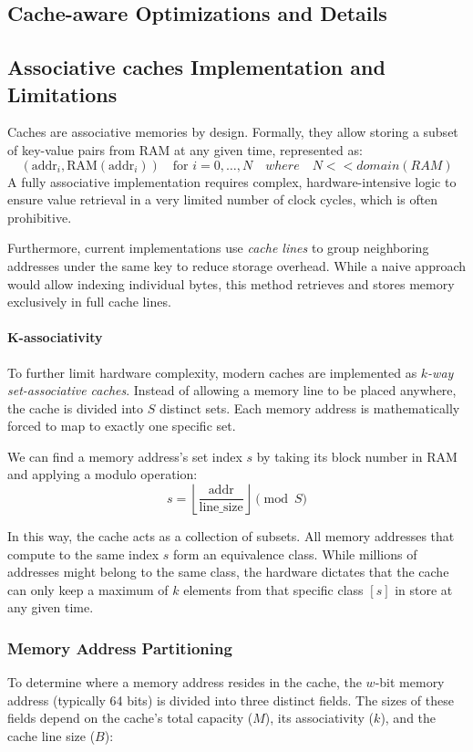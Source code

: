 \begin{appendices}
\section{Cache-aware Optimizations and Details}\label{app:caching}


\subsection{Associative caches Implementation and Limitations}\label{subsec:caching}
Caches are associative memories by design. Formally, they allow storing a subset of key-value pairs from RAM at any given time, represented as:
$$(\text{addr}_i, \text{RAM}(\text{addr}_i)) \quad \text{for } i = 0, \dots, N \quad where \quad  N << domain(RAM)$$
A fully associative implementation requires complex, hardware-intensive logic to ensure value retrieval in a very limited number of clock cycles, which is often prohibitive. 

Furthermore, current implementations use \emph{cache lines} to group neighboring addresses under the same key to reduce storage overhead. While a naive approach would allow indexing individual bytes, this method retrieves and stores memory exclusively in full cache lines.

\paragraph{K-associativity}To further limit hardware complexity, modern caches are implemented as \emph{$k$-way set-associative caches}. Instead of allowing a memory line to be placed anywhere, the cache is divided into $S$ distinct sets. Each memory address is mathematically forced to map to exactly one specific set.

We can find a memory address's set index $s$ by taking its block number in RAM and applying a modulo operation:
$$s = \left\lfloor \frac{\text{addr}}{\text{line\_size}} \right\rfloor \pmod S$$

In this way, the cache acts as a collection of subsets. All memory addresses that compute to the same index $s$ form an equivalence class. While millions of addresses might belong to the same class, the hardware dictates that the cache can only keep a maximum of $k$ elements from that specific class $[s]$ in store at any given time.

\subsubsection{Memory Address Partitioning}
To determine where a memory address resides in the cache, the $w$-bit memory address (typically 64 bits) is divided into three distinct fields. The sizes of these fields depend on the cache's total capacity ($M$), its associativity ($k$), and the cache line size ($B$):


\end{appendices}

